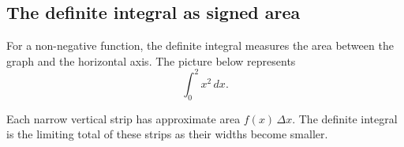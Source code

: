 \subsection{The definite integral as signed area}

For a non-negative function, the definite integral measures the area between the graph and the horizontal axis. The picture below represents
\[
\int_0^2 x^2\,dx.
\]

\begin{center}
\end{center}

\begin{interpretationbox}
Each narrow vertical strip has approximate area $f(x)\,\Delta x$. The definite integral is the limiting total of these strips as their widths become smaller.
\end{interpretationbox}
